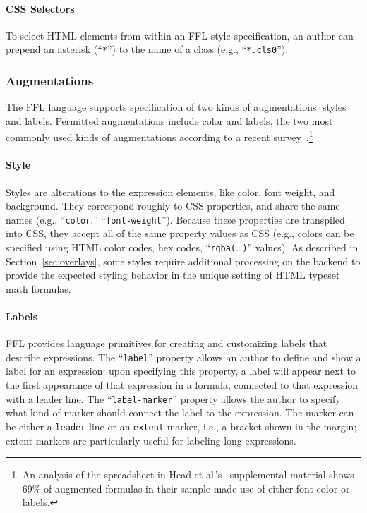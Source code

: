 \paragraph{CSS Selectors} To select HTML elements from within an FFL style specification, an author can prepend an asterisk (``\texttt{*}'') to the name of a class (e.g., ``\texttt{*.cls0}'').

\subsubsection{Augmentations}

The FFL language supports specification of two kinds of augmentations: styles and labels. Permitted augmentations include color and labels, the two most commonly used kinds of augmentations according to a recent survey~\cite{ref:head2022math}.\footnote{An analysis of the spreadsheet in Head et al.'s~\cite{ref:head2022math} supplemental material shows 69\% of augmented formulas in their sample made use of either font color or labels.}

\paragraph{Style}
Styles are alterations to the expression elements, like color, font weight, and background. They correspond roughly to CSS properties, and share the same names (e.g., ``\texttt{color},'' ``\texttt{font-weight}''). Because these properties are transpiled into CSS, they accept all of the same property values as CSS (e.g., colors can be specified using HTML color codes, hex codes, ``\texttt{rgba(}\dots\texttt{)}'' values). As described in Section~\ref{sec:overlays}, some styles require additional processing on the backend to provide the expected styling behavior in the unique setting of HTML typeset math formulas.

\paragraph{Labels}
FFL provides language primitives for creating and customizing labels that describe expressions. The ``\texttt{label}'' property allows an author to define and show a label for an expression: upon specifying this property, a label will appear next to the first appearance of that expression in a formula, connected to that expression with a leader line. The ``\texttt{label-marker}'' property allows the author to specify what kind of marker should connect the label to the expression. The marker can be either a \texttt{leader} line or an \texttt{extent} marker, i.e., a bracket shown in the margin; extent markers are particularly useful for labeling long expressions.

